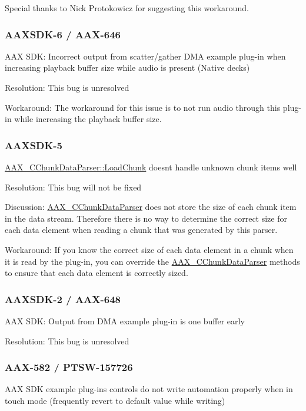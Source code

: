 Special thanks to Nick Protokowicz for suggesting this workaround.\hypertarget{a00846_AAXSDK-6}{}\subsubsection{A\+A\+X\+S\+D\+K-\/6 / A\+A\+X-\/646}\label{a00846_AAXSDK-6}
A\+AX S\+DK\+: Incorrect output from scatter/gather D\+MA example plug-\/in when increasing playback buffer size while audio is present (Native decks)

Resolution\+: This bug is unresolved

Workaround\+: The workaround for this issue is to not run audio through this plug-\/in while increasing the playback buffer size.\hypertarget{a00846_AAXSDK-5}{}\subsubsection{A\+A\+X\+S\+D\+K-\/5}\label{a00846_AAXSDK-5}
\mbox{\hyperlink{a01461_a25fc41a1060445db4d7bee7a2919460d}{A\+A\+X\+\_\+\+C\+Chunk\+Data\+Parser\+::\+Load\+Chunk}} doesn\textquotesingle{}t handle unknown chunk items well

Resolution\+: This bug will not be fixed

Discussion\+: \mbox{\hyperlink{a01461}{A\+A\+X\+\_\+\+C\+Chunk\+Data\+Parser}} does not store the size of each chunk item in the data stream. Therefore there is no way to determine the correct size for each data element when reading a chunk that was generated by this parser.

Workaround\+: If you know the correct size of each data element in a chunk when it is read by the plug-\/in, you can override the \mbox{\hyperlink{a01461}{A\+A\+X\+\_\+\+C\+Chunk\+Data\+Parser}} methods to ensure that each data element is correctly sized.\hypertarget{a00846_AAXSDK-2}{}\subsubsection{A\+A\+X\+S\+D\+K-\/2 / A\+A\+X-\/648}\label{a00846_AAXSDK-2}
A\+AX S\+DK\+: Output from D\+MA example plug-\/in is one buffer early

Resolution\+: This bug is unresolved\hypertarget{a00846_AAX-582}{}\subsubsection{A\+A\+X-\/582 / P\+T\+S\+W-\/157726}\label{a00846_AAX-582}
A\+AX S\+DK example plug-\/ins\textquotesingle{} controls do not write automation properly when in \textquotesingle{}touch\textquotesingle{} mode (frequently revert to default value while writing)

